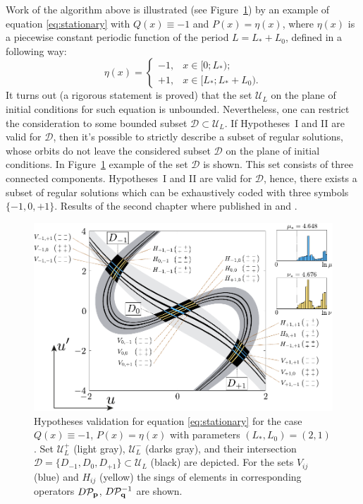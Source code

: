 \documentclass[candidate, href, colorlinks]{disser}
\begin{document}
Work of the algorithm above is illustrated (see Figure~\ref{fig:hypotheses-validation}) by an example of equation \eqref{eq:stationary} with $Q(x) \equiv -1$ and $P(x) = \eta(x)$, where $\eta(x)$ is a piecewise constant periodic function of the period $L = L_* + L_0$, defined in a following way:
\begin{equation}
	\eta(x) = \left\{
		\begin{array}{rl}
			-1, & x \in [0; L_*); \\
			+1, & x \in [L_*; L_* + L_0).
		\end{array}
	\right.
\label{eq:eta}
\end{equation}
It turns out (a rigorous statement is proved) that the set $\mathscr{U}_L$ on the plane of initial conditions for such equation is unbounded.
Nevertheless, one can restrict the consideration to some bounded subset $\mathcal{D} \subset \mathscr{U}_L$.
If Hypotheses~I and II are valid for $\mathcal{D}$, then it's possible to strictly describe a subset of regular solutions, whose orbits do not leave the considered subset $\mathcal{D}$ on the plane of initial conditions.
In Figure~\ref{fig:hypotheses-validation} example of the set $\mathcal{D}$ is shown.
This set consists of three connected components.
Hypotheses~I and II are valid for $\mathcal{D}$, hence, there exists a subset of regular solutions which can be exhaustively coded with three symbols $\{-1, 0, +1\}$.
Results of the second chapter where published in \cite{Bannoe2019} and \cite{Bannoe2021}.

\begin{figure}[h]
\centering
	\includegraphics[scale = 1]{../pic/hypotheses for piecewise equation}
	\caption{
		Hypotheses validation for equation \eqref{eq:stationary} for the case $Q(x) \equiv -1$, $P(x) = \eta(x)$ with parameters $(L_*, L_0) = (2, 1)$.
		Set $\mathscr{U}_L^+$ (light gray), $\mathscr{U}_L^-$ (darks gray), and their intersection $\mathcal{D} = \{ D_{-1}, D_0, D_{+1} \} \subset \mathscr{U}_L$ (black) are depicted.
		For the sets $V_{ij}$ (blue) and $H_{ij}$ (yellow) the sings of elements in corresponding operators $D \mathcal{P}_{\vb{p}}$, $D \mathcal{P}_{\vb{q}}^{-1}$ are shown.
	}
\label{fig:hypotheses-validation}
\end{figure}
\end{document}
